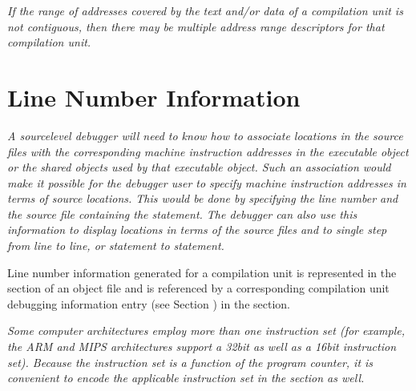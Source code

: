 \textit{If the range of addresses covered by the text and/or data
of a compilation unit is not contiguous, then there may be
multiple address range descriptors for that compilation unit.}




\section{Line Number Information}
\label{chap:linenumberinformation}
\textit{A source\dash level debugger will need to know how to
associate locations in the source files with the corresponding
machine instruction addresses in the executable object or
the shared objects used by that executable object. Such an
association would make it possible for the debugger user
to specify machine instruction addresses in terms of source
locations. This would be done by specifying the line number
and the source file containing the statement. The debugger
can also use this information to display locations in terms
of the source files and to single step from line to line,
or statement to statement.}

Line number information generated for a compilation unit is
represented in the 
 section of an object file and
is referenced by a corresponding compilation unit debugging
information entry 
(see Section ) 
in the 
section.

\textit{Some computer architectures employ more than one instruction
set (for example, the ARM 
and 
MIPS architectures support
a 32\dash bit as well as a 16\dash bit instruction set). Because the
instruction set is a function of the program counter, it is
convenient to encode the applicable instruction set in the
 section as well.}

